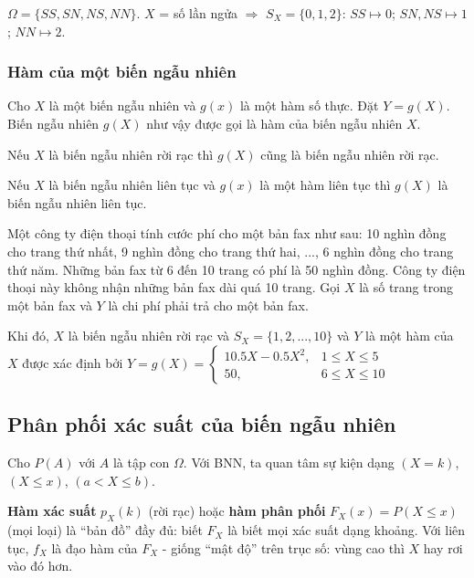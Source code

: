 \documentclass[12pt,a4paper]{article}
\begin{document}
\begin{vidu}[title={Số mặt ngửa khi tung xu 2 lần}]
$\Omega = \{SS, SN, NS, NN\}$. $X$ = số lần ngửa $\Rightarrow$ $S_X = \{0,1,2\}$:
$SS \mapsto 0$; $SN, NS \mapsto 1$; $NN \mapsto 2$.
\end{vidu}

\subsubsection{Hàm của một biến ngẫu nhiên}

\begin{dinhnghia}
Cho $X$ là một biến ngẫu nhiên và $g(x)$ là một hàm số thực. Đặt $Y = g(X)$. Biến ngẫu nhiên $g(X)$ như vậy được gọi là hàm của biến ngẫu nhiên $X$.

Nếu $X$ là biến ngẫu nhiên rời rạc thì $g(X)$ cũng là biến ngẫu nhiên rời rạc.

Nếu $X$ là biến ngẫu nhiên liên tục và $g(x)$ là một hàm liên tục thì $g(X)$ là biến ngẫu nhiên liên tục.
\end{dinhnghia}

\begin{vidu}[title={Hàm của biến ngẫu nhiên}]
Một công ty điện thoại tính cước phí cho một bản fax như sau: 10 nghìn đồng cho trang thứ nhất, 9 nghìn đồng cho trang thứ hai, ..., 6 nghìn đồng cho trang thứ năm. Những bản fax từ 6 đến 10 trang có phí là 50 nghìn đồng. Công ty điện thoại này không nhận những bản fax dài quá 10 trang. Gọi $X$ là số trang trong một bản fax và $Y$ là chi phí phải trả cho một bản fax.

Khi đó, $X$ là biến ngẫu nhiên rời rạc và $S_X = \{1, 2, ..., 10\}$ và $Y$ là một hàm của $X$ được xác định bởi $Y = g(X) = \begin{cases} 10.5X - 0.5X^2, & 1 \le X \le 5 \\ 50, & 6 \le X \le 10 \end{cases}$
\end{vidu}

\subsection{Phân phối xác suất của biến ngẫu nhiên}

\begin{dongco}
Cho $P(A)$ với $A$ là tập con $\Omega$. Với BNN, ta quan tâm sự kiện dạng $(X = k)$, $(X \le x)$, $(a < X \le b)$.

\textbf{Hàm xác suất} $p_X(k)$ (rời rạc) hoặc \textbf{hàm phân phối} $F_X(x) = P(X \le x)$ (mọi loại) là ``bản đồ'' đầy đủ: biết $F_X$ là biết mọi xác suất dạng khoảng. Với liên tục, $f_X$ là đạo hàm của $F_X$ - giống ``mật độ'' trên trục số: vùng cao thì $X$ hay rơi vào đó hơn.
\end{dongco}
\end{document}
